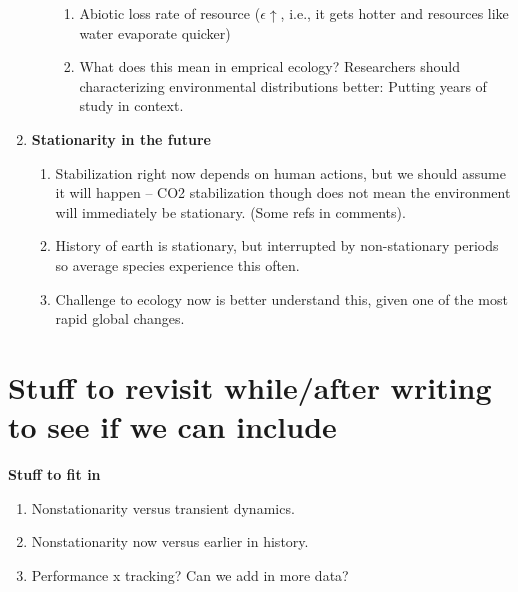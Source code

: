 \documentclass[11pt,letterpaper]{article}
\begin{document}
\begin{enumerate}
\begin{enumerate}
\begin{enumerate}
\item Abiotic loss rate of resource ($\epsilon \uparrow$, i.e., it gets hotter and resources like water evaporate quicker)
\item What does this mean in emprical ecology? Researchers should characterizing environmental distributions better: Putting years of study in context. 
\end{enumerate}
\end{enumerate}
\item {\bf Stationarity in the future} 
\begin{enumerate}
\item Stabilization right now depends on human actions, but we should assume it will happen -- CO2 stabilization though does not mean the environment will immediately be stationary. (Some refs in comments). %
\item History of earth is stationary, but interrupted by non-stationary periods so average species experience this often.
\item Challenge to ecology now is better understand this, given one of the most rapid global changes.
\end{enumerate}
\end{enumerate}




\section{Stuff to revisit while/after writing to see if we can include}

{\bf Stuff to fit in}
\begin{enumerate}
\item Nonstationarity versus transient dynamics. 
\item Nonstationarity now versus earlier in history. 
\item Performance x tracking? Can we add in more data?
\end{enumerate}
\end{document}
